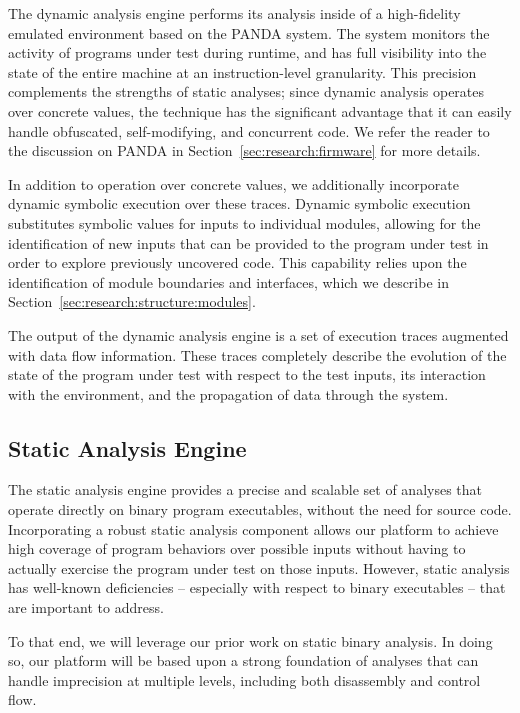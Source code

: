 \documentclass[letterpaper,twoside,11pt,headings=small]{scrartcl}
\newcommand{\dynamicsys}{\textsc{PANDA}\xspace}
\begin{document}
The dynamic analysis engine performs its analysis inside of a high-fidelity
emulated environment based on the \dynamicsys system.  The system monitors the
activity of programs under test during runtime, and has full visibility into
the state of the entire machine at an instruction-level granularity.  This
precision complements the strengths of static analyses; since dynamic analysis
operates over concrete values, the technique has the significant advantage
that it can easily handle obfuscated, self-modifying, and concurrent code.  We
refer the reader to the discussion on \dynamicsys in
Section~\ref{sec:research:firmware} for more details.

In addition to operation over concrete values, we additionally incorporate
dynamic symbolic execution over these traces.  Dynamic symbolic execution
substitutes symbolic values for inputs to individual modules, allowing for the
identification of new inputs that can be provided to the program under test in
order to explore previously uncovered code.  This capability relies upon the
identification of module boundaries and interfaces, which we describe in
Section~\ref{sec:research:structure:modules}.

The output of the dynamic analysis engine is a set of execution traces
augmented with data flow information.  These traces completely describe the
evolution of the state of the program under test with respect to the test
inputs, its interaction with the environment, and the propagation of data
through the system.

\subsection{Static Analysis Engine}

The static analysis engine provides a precise and scalable set of analyses
that operate directly on binary program executables, without the need for
source code.  Incorporating a robust static analysis component allows our
platform to achieve high coverage of program behaviors over possible inputs
without having to actually exercise the program under test on those inputs.
However, static analysis has well-known deficiencies -- especially with
respect to binary executables -- that are important to address.

To that end, we will leverage our prior work on static binary analysis. In
doing so, our platform will be based upon a strong foundation of analyses that
can handle imprecision at multiple levels, including both disassembly and
control flow.
\end{document}
